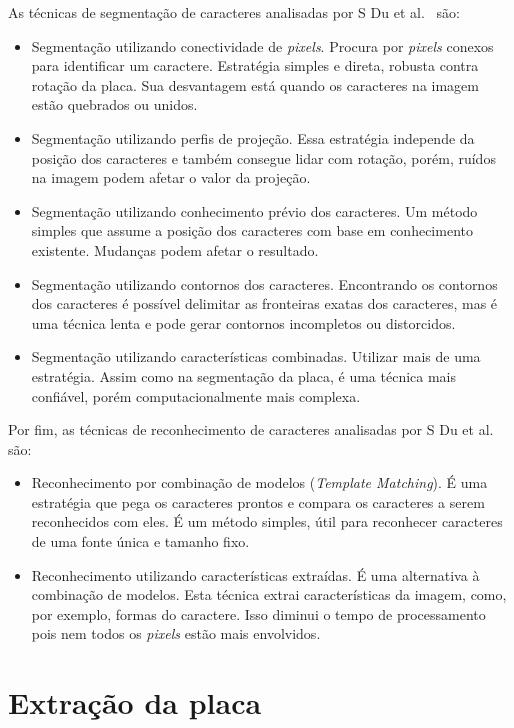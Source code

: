 As técnicas de segmentação de caracteres analisadas por S Du et al.~\cite{s2013automatic} são:

\begin{itemize}
	\item Segmentação utilizando conectividade de \emph{pixels}. Procura por \emph{pixels} conexos para identificar um caractere. Estratégia simples e direta, robusta contra rotação da placa. Sua desvantagem está quando os caracteres na imagem estão quebrados ou unidos.
    \item Segmentação utilizando perfis de projeção. Essa estratégia independe da posição dos caracteres e também consegue lidar com rotação, porém, ruídos na imagem podem afetar o valor da projeção.
    \item Segmentação utilizando conhecimento prévio dos caracteres. Um método simples que assume a posição dos caracteres com base em conhecimento existente. Mudanças podem afetar o resultado.
    \item Segmentação utilizando contornos dos caracteres. Encontrando os contornos dos caracteres é possível delimitar as fronteiras exatas dos caracteres, mas é uma técnica lenta e pode gerar contornos incompletos ou distorcidos.
    \item Segmentação utilizando características combinadas. Utilizar mais de uma estratégia. Assim como na segmentação da placa, é uma técnica mais confiável, porém computacionalmente mais complexa.    
\end{itemize}

Por fim, as técnicas de reconhecimento de caracteres analisadas por S Du et al.~\cite{s2013automatic} são:

\begin{itemize}
	\item Reconhecimento por combinação de modelos (\emph{Template Matching}). É uma estratégia que pega os caracteres prontos e compara os caracteres a serem reconhecidos com eles. É um método simples, útil para reconhecer caracteres de uma fonte única e tamanho fixo.
    \item Reconhecimento utilizando características extraídas. É uma alternativa à combinação de modelos. Esta técnica extrai características da imagem, como, por exemplo, formas do caractere. Isso diminui o tempo de processamento pois nem todos os \emph{pixels} estão mais envolvidos. 
\end{itemize}

\section{Extração da placa}

